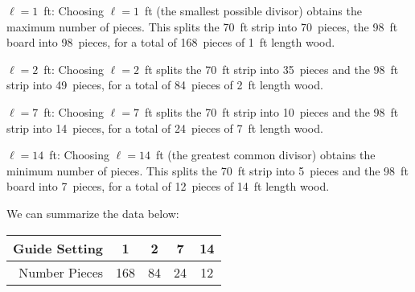 \documentclass[11pt,letterpaper]{article}
\begin{document}
$\ell= 1$~ft: Choosing $\ell= 1$~ft (the smallest possible divisor) obtains the maximum number of pieces. This splits the 70~ft strip into 70~pieces, the 98~ft board into 98~pieces, for a total of 168~pieces of 1~ft length wood. \pspace

$\ell= 2$~ft: Choosing $\ell= 2$~ft splits the 70~ft strip into 35~pieces and the 98~ft strip into 49~pieces, for a total of 84~pieces of 2~ft length wood. \pspace

$\ell= 7$~ft: Choosing $\ell= 7$~ft splits the 70~ft strip into 10~pieces and the 98~ft strip into 14~pieces, for a total of 24~pieces of 7~ft length wood. \pspace

$\ell= 14$~ft: Choosing $\ell= 14$~ft (the greatest common divisor) obtains the minimum number of pieces. This splits the 70~ft strip into 5~pieces and the 98~ft board into 7~pieces, for a total of 12~pieces of 14~ft length wood. \pspace

We can summarize the data below: \par
	\begin{table}[h]
	\centering
	\begin{tabular}{r||c|c|c|c}
	Guide Setting & 1 & 2 & 7 & 14 \\ \hline
	Number Pieces & 168 & 84 & 24 & 12
	\end{tabular}
	\end{table}
\end{document}
